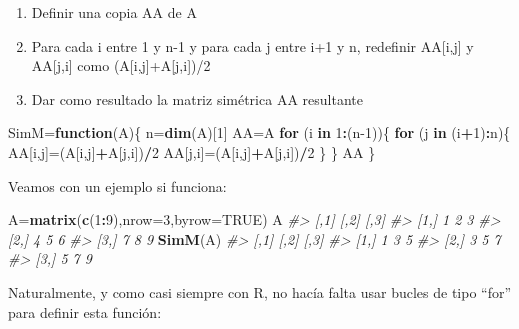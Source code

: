 \documentclass[
]{book}
\newenvironment{Shaded}{\begin{snugshade}}{\end{snugshade}}
\newcommand{\CommentTok}[1]{\textcolor[rgb]{0.56,0.35,0.01}{\textit{#1}}}
\newcommand{\ControlFlowTok}[1]{\textcolor[rgb]{0.13,0.29,0.53}{\textbf{#1}}}
\newcommand{\DataTypeTok}[1]{\textcolor[rgb]{0.13,0.29,0.53}{#1}}
\newcommand{\DecValTok}[1]{\textcolor[rgb]{0.00,0.00,0.81}{#1}}
\newcommand{\KeywordTok}[1]{\textcolor[rgb]{0.13,0.29,0.53}{\textbf{#1}}}
\newcommand{\NormalTok}[1]{#1}
\newcommand{\OperatorTok}[1]{\textcolor[rgb]{0.81,0.36,0.00}{\textbf{#1}}}
\newcommand{\OtherTok}[1]{\textcolor[rgb]{0.56,0.35,0.01}{#1}}
\providecommand{\tightlist}{%
  \setlength{\itemsep}{0pt}\setlength{\parskip}{0pt}}
\theoremstyle{definition}
\theoremstyle{definition}
\theoremstyle{definition}
\theoremstyle{remark}
\begin{document}
\begin{enumerate}
\def\labelenumi{\arabic{enumi}.}
\tightlist
\item
  Definir una copia AA de A
\item
  Para cada i entre 1 y n-1 y para cada j entre i+1 y n, redefinir AA{[}i,j{]} y AA{[}j,i{]} como (A{[}i,j{]}+A{[}j,i{]})/2
\item
  Dar como resultado la matriz simétrica AA resultante
\end{enumerate}

\begin{Shaded}
\begin{Highlighting}[]
\NormalTok{SimM=}\ControlFlowTok{function}\NormalTok{(A)\{}
\NormalTok{  n=}\KeywordTok{dim}\NormalTok{(A)[}\DecValTok{1}\NormalTok{]}
\NormalTok{  AA=A}
  \ControlFlowTok{for}\NormalTok{ (i }\ControlFlowTok{in} \DecValTok{1}\OperatorTok{:}\NormalTok{(n}\DecValTok{{-}1}\NormalTok{))\{}
    \ControlFlowTok{for}\NormalTok{ (j }\ControlFlowTok{in}\NormalTok{ (i}\OperatorTok{+}\DecValTok{1}\NormalTok{)}\OperatorTok{:}\NormalTok{n)\{}
\NormalTok{      AA[i,j]=(A[i,j]}\OperatorTok{+}\NormalTok{A[j,i])}\OperatorTok{/}\DecValTok{2}
\NormalTok{      AA[j,i]=(A[i,j]}\OperatorTok{+}\NormalTok{A[j,i])}\OperatorTok{/}\DecValTok{2}
\NormalTok{    \}}
\NormalTok{  \}}
\NormalTok{AA}
\NormalTok{\}}
\end{Highlighting}
\end{Shaded}

Veamos con un ejemplo si funciona:

\begin{Shaded}
\begin{Highlighting}[]
\NormalTok{A=}\KeywordTok{matrix}\NormalTok{(}\KeywordTok{c}\NormalTok{(}\DecValTok{1}\OperatorTok{:}\DecValTok{9}\NormalTok{),}\DataTypeTok{nrow=}\DecValTok{3}\NormalTok{,}\DataTypeTok{byrow=}\OtherTok{TRUE}\NormalTok{)}
\NormalTok{A}
\CommentTok{\#\textgreater{}      [,1] [,2] [,3]}
\CommentTok{\#\textgreater{} [1,]    1    2    3}
\CommentTok{\#\textgreater{} [2,]    4    5    6}
\CommentTok{\#\textgreater{} [3,]    7    8    9}
\KeywordTok{SimM}\NormalTok{(A)}
\CommentTok{\#\textgreater{}      [,1] [,2] [,3]}
\CommentTok{\#\textgreater{} [1,]    1    3    5}
\CommentTok{\#\textgreater{} [2,]    3    5    7}
\CommentTok{\#\textgreater{} [3,]    5    7    9}
\end{Highlighting}
\end{Shaded}

Naturalmente, y como casi siempre con R, no hacía falta usar bucles de tipo ``for'' para definir esta función:
\end{document}
